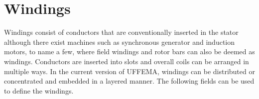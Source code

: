\documentclass[justified]{tufte-book} %
\begin{document}
\chapter{Windings}\label{ch:windings}
\begin{fullwidth}
Windings consist of conductors that are conventionally inserted in the stator although there exist machines such as synchronous generator and induction motors, to name a few, where field windings and rotor bars can also be deemed as windings. 
Conductors are inserted into slots and overall coils can be arranged in multiple ways. In the current version of UFFEMA, windings can be distributed or concentrated and embedded in a layered manner.
The following fields can be used to define the windings.   
\end{fullwidth}
\end{document}
